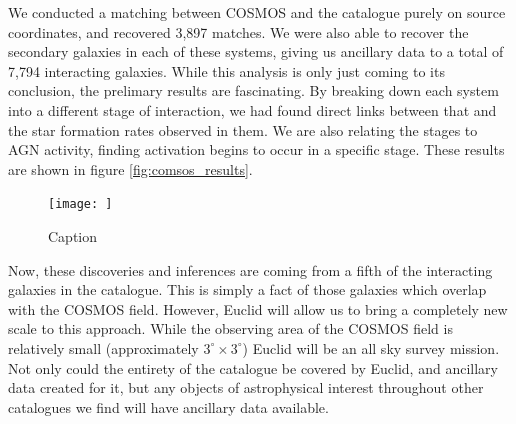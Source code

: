 \documentclass[11pt,usenatbib]{article}
\begin{document}
We conducted a matching between COSMOS and the \citet{O'Ryan} catalogue purely on source coordinates, and recovered 3,897 matches. We were also able to recover the secondary galaxies in each of these systems, giving us ancillary data to a total of 7,794 interacting galaxies. While this analysis is only just coming to its conclusion, the prelimary results are fascinating. By breaking down each system into a different stage of interaction, we had found direct links between that and the star formation rates observed in them. We are also relating the stages to AGN activity, finding activation begins to occur in a specific stage. These results are shown in figure \ref{fig:comsos_results}.

\begin{figure}
    \centering
    \texttt{[image: ]}
    \caption{Caption}
    \label{fig:cosmos-label}
\end{figure}

Now, these discoveries and inferences are coming from a fifth of the interacting galaxies in the \citet{O'Ryan} catalogue. This is simply a fact of those galaxies which overlap with the COSMOS field. However, Euclid will allow us to bring a completely new scale to this approach. While the observing area of the COSMOS field is relatively small (approximately $3^{\circ} \times 3^{\circ}$) Euclid will be an all sky survey mission. Not only could the entirety of the \citet{O'Ryan} catalogue be covered by Euclid, and ancillary data created for it, but any objects of astrophysical interest throughout other catalogues we find will have ancillary data available.
\end{document}

